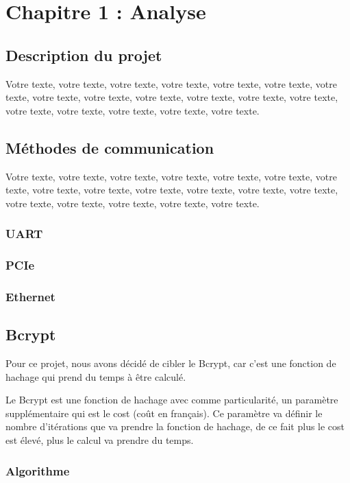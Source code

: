\chapter{Chapitre 1 : Analyse}

\section{Description du projet}
Votre texte, votre texte, votre texte, votre texte, votre texte, votre texte, votre texte, votre texte, votre texte, votre texte, votre texte, votre texte, votre texte, votre texte, votre texte, votre texte, votre texte, votre texte.

\section{Méthodes de communication}
Votre texte, votre texte, votre texte, votre texte, votre texte, votre texte, votre texte, votre texte, votre texte, votre texte, votre texte, votre texte, votre texte, votre texte, votre texte, votre texte, votre texte, votre texte.
\subsection{UART}
\subsection{PCIe}
\subsection{Ethernet}

\section{Bcrypt}

Pour ce projet, nous avons décidé de cibler le Bcrypt, car c'est une fonction de hachage qui prend du temps à être calculé. 

Le Bcrypt est une fonction de hachage avec comme particularité, un paramètre supplémentaire qui est le cost (coût en français).
Ce paramètre va définir le nombre d'itérations que va prendre la fonction de hachage, de ce fait plus le cost est élevé, plus le calcul va prendre du temps.

\subsection{Algorithme}

